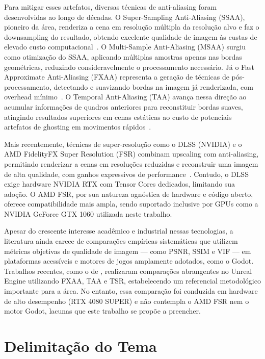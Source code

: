 \documentclass[twoside,english,brazilian]{UNISINOSmonografia}
\begin{document}
Para mitigar esses artefatos, diversas técnicas de anti-aliasing foram desenvolvidas ao longo de décadas. O Super-Sampling Anti-Aliasing (SSAA), pioneiro da área, renderiza a cena em resolução múltipla da resolução alvo e faz o downsampling do resultado, obtendo excelente qualidade de imagem às custas de elevado custo computacional~\cite{real_time_rendering_4th}. O Multi-Sample Anti-Aliasing (MSAA) surgiu como otimização do SSAA, aplicando múltiplas amostras apenas nas bordas geométricas, reduzindo consideravelmente o processamento necessário. Já o Fast Approximate Anti-Aliasing (FXAA) representa a geração de técnicas de pós-processamento, detectando e suavizando bordas na imagem já renderizada, com overhead mínimo~\cite{lottes2011fxaa}. O Temporal Anti-Aliasing (TAA) avança nessa direção ao acumular informações de quadros anteriores para reconstituir bordas suaves, atingindo resultados superiores em cenas estáticas ao custo de potenciais artefatos de ghosting em movimentos rápidos~\cite{yang2020dlss}.

Mais recentemente, técnicas de super-resolução como o DLSS (NVIDIA) e o AMD FidelityFX Super Resolution (FSR) combinam upscaling com anti-aliasing, permitindo renderizar a cenas em resoluções reduzidas e reconstruir uma imagem de alta qualidade, com ganhos expressivos de performance~\cite{amd_fsr}. Contudo, o DLSS exige hardware NVIDIA RTX com Tensor Cores dedicados, limitando sua adoção. O AMD FSR, por sua natureza agnóstica de hardware e código aberto, oferece compatibilidade mais ampla, sendo suportado inclusive por GPUs como a NVIDIA GeForce GTX 1060 utilizada neste trabalho.

Apesar do crescente interesse acadêmico e industrial nessas tecnologias, a literatura ainda carece de comparações empíricas sistemáticas que utilizem métricas objetivas de qualidade de imagem — como PSNR, SSIM e VIF — em plataformas acessíveis e motores de jogos amplamente adotados, como o Godot. Trabalhos recentes, como o de , realizaram comparações abrangentes no Unreal Engine utilizando FXAA, TAA e TSR, estabelecendo um referencial metodológico importante para a área. No entanto, essa comparação foi conduzida em hardware de alto desempenho (RTX 4080 SUPER) e não contempla o AMD FSR nem o motor Godot, lacunas que este trabalho se propõe a preencher.

\section{Delimitação do Tema}
\end{document}
